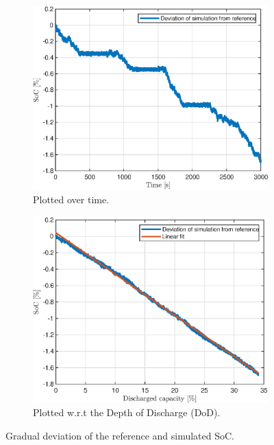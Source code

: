 \begin{figure}[tbp]
    \centering

\begin{subfigure}{0.49\textwidth}
    \centering
    \includegraphics[width=\textwidth]{figures/7/validation-deviation-in-time.eps}
    \caption{Plotted over time.}
    \label{fig:7-validation-deviation-in-time}
    \end{subfigure}
    \hfill
    \begin{subfigure}{0.49\textwidth}
    \centering
    \includegraphics[width=\textwidth]{figures/7/validation-deviation.eps}
    \caption{Plotted w.r.t the Depth of Discharge (DoD).}
    \label{fig:7-validation-deviation}
    \end{subfigure}
    
    \caption{Gradual deviation of the reference and simulated SoC.}
    \label{fig:7-deviation}
\end{figure}

